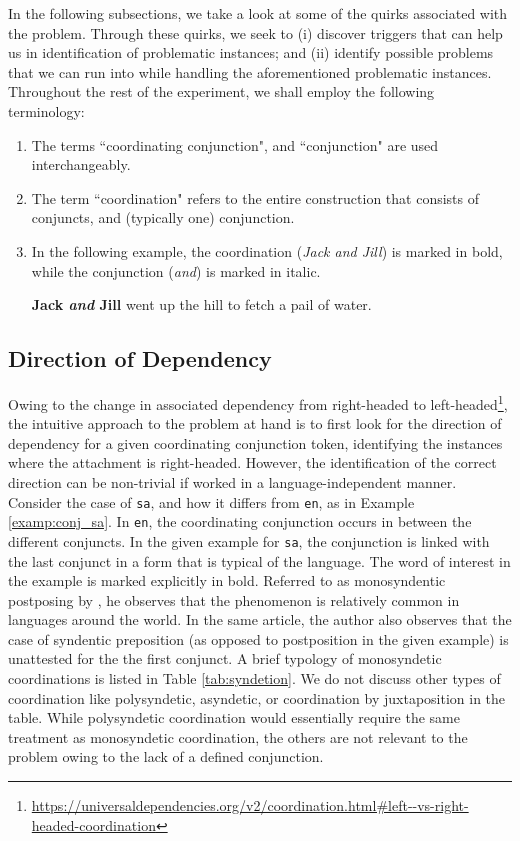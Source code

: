 In the following subsections, we take a look at some of the quirks associated with the problem. Through these quirks, we seek to (i) discover triggers that can help us in identification of problematic instances; and (ii) identify possible problems that we can run into while handling the aforementioned problematic instances. Throughout the rest of the experiment, we shall employ the following terminology:

\begin{enumerate}
    \item The terms ``coordinating conjunction", and ``conjunction" are used interchangeably.
    \item The term ``coordination" refers to the entire construction that consists of conjuncts, and (typically one) conjunction.
    \item In the following example, the coordination (\textit{Jack and Jill}) is marked in bold, while the conjunction (\textit{and}) is marked in italic.
    \begin{example}
    \textbf{Jack \textit{and} Jill} went up the hill to fetch a pail of water.
    \end{example}
\end{enumerate}

\subsection{Direction of Dependency}

Owing to the change in associated dependency from right-headed to left-headed\footnote{\url{https://universaldependencies.org/v2/coordination.html\#left--vs-right-headed-coordination}}, the intuitive approach to the problem at hand is to first look for the direction of dependency for a given coordinating conjunction token, identifying the instances where the attachment is right-headed. However, the identification of the correct direction can be non-trivial if worked in a language-independent manner. Consider the case of \verb|sa|, and how it differs from \verb|en|, as in Example \ref{examp:conj_sa}. In \verb|en|, the coordinating conjunction occurs in between the different conjuncts. In the given example for \verb|sa|, the conjunction is linked with the last conjunct in a form that is typical of the language. The word of interest in the example is marked explicitly in bold. Referred to as monosyndentic postposing by \cite{stassen}, he observes that the phenomenon is relatively common in languages around the world. In the same article, the author also observes that the case of syndentic preposition (as opposed to postposition in the given example) is unattested for the the first conjunct. A brief typology of monosyndetic coordinations is listed in Table \ref{tab:syndetion}. We do not discuss other types of coordination like polysyndetic, asyndetic, or coordination by juxtaposition in the table. While polysyndetic coordination would essentially require the same treatment as monosyndetic coordination, the others are not relevant to the problem owing to the lack of a defined conjunction.

